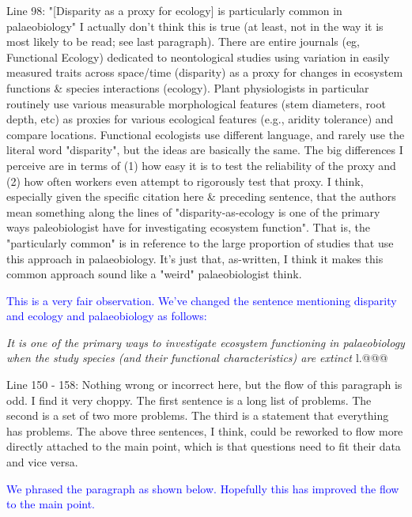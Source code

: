 \documentclass[12pt,letterpaper]{article}
\begin{document}
\noindent Line 98: "[Disparity as a proxy for ecology] is particularly common in palaeobiology" I actually don't think this is true (at least, not in the way it is most likely to be read; see last paragraph). There are entire journals (eg, Functional Ecology) dedicated to neontological studies using variation in easily measured traits across space/time (disparity) as a proxy for changes in ecosystem functions \& species interactions (ecology). Plant physiologists in particular routinely use various measurable morphological features (stem diameters, root depth, etc) as proxies for various ecological features (e.g., aridity tolerance) and compare locations. 
Functional ecologists use different language, and rarely use the literal word "disparity", but the ideas are basically the same. The big differences I perceive are in terms of (1) how easy it is to test the reliability of the proxy and (2) how often workers even attempt to rigorously test that proxy. 
I think, especially given the specific citation here \& preceding sentence, that the authors mean something along the lines of "disparity-as-ecology is one of the primary ways paleobiologist have for investigating ecosystem function". That is, the "particularly common" is in reference to the large proportion of studies that use this approach in palaeobiology. It's just that, as-written, I think it makes this common approach sound like a "weird" palaeobiologist think.

\textcolor{blue}{This is a very fair observation. We've changed the sentence mentioning disparity and ecology and palaeobiology as follows:}

\textit{It is one of the primary ways to investigate ecosystem functioning in palaeobiology when the study species (and their functional characteristics) are extinct \citep{Wainwright2005}} l.@@@

\noindent Line 150 - 158: Nothing wrong or incorrect here, but the flow of this paragraph is odd. I find it very choppy. The first sentence is a long list of problems. The second is a set of two more problems. The third is a statement that everything has problems. The above three sentences, I think, could be reworked to flow more directly attached to the main point, which is that questions need to fit their data and vice versa.

\textcolor{blue}{We phrased the paragraph as shown below. Hopefully this has improved the flow to the main point.}
\end{document}
